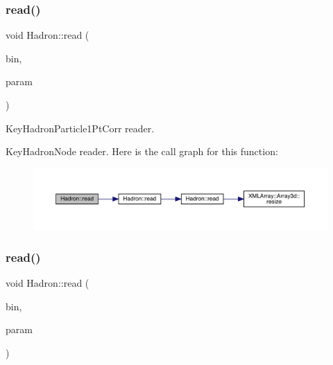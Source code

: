 \subsubsection{\texorpdfstring{read()}{read()}\hspace{0.1cm}{\footnotesize\ttfamily [80/94]}}
{\footnotesize\ttfamily void Hadron\+::read (\begin{DoxyParamCaption}\item[{\mbox{\hyperlink{classADATIO_1_1BinaryReader}{Binary\+Reader}} \&}]{bin,  }\item[{\mbox{\hyperlink{structHadron_1_1KeyHadronNode__t}{Key\+Hadron\+Node\+\_\+t}} \&}]{param }\end{DoxyParamCaption})}



Key\+Hadron\+Particle1\+Pt\+Corr reader. 

Key\+Hadron\+Node reader. Here is the call graph for this function\+:\nopagebreak
\begin{figure}[H]
\begin{center}
\leavevmode
\includegraphics[width=350pt]{d1/daf/namespaceHadron_ac376de4f56715288fc1a3eb4e0cc6725_cgraph}
\end{center}
\end{figure}
\mbox{\label{namespaceHadron_a0567f3fb8f2db68b0a93251138c13a62}} 
\subsubsection{\texorpdfstring{read()}{read()}\hspace{0.1cm}{\footnotesize\ttfamily [81/94]}}
{\footnotesize\ttfamily void Hadron\+::read (\begin{DoxyParamCaption}\item[{\mbox{\hyperlink{classADATIO_1_1BinaryReader}{Binary\+Reader}} \&}]{bin,  }\item[{\mbox{\hyperlink{structHadron_1_1KeyHadronNPartIrrepOp__t_1_1CGPair__t}{Key\+Hadron\+N\+Part\+Irrep\+Op\+\_\+t\+::\+C\+G\+Pair\+\_\+t}} \&}]{param }\end{DoxyParamCaption})}

